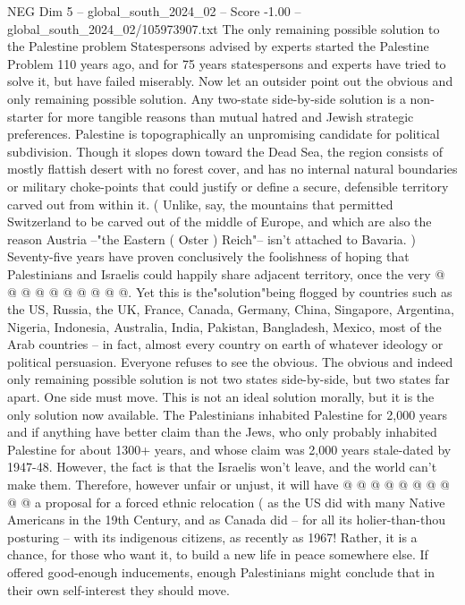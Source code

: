 \begin{textsample}{NEG Dim 5 – global\_south\_2024\_02 – Score -1.00 – global\_south\_2024\_02/105973907.txt}  \label{ex:f5_neg_300}
The only remaining possible solution to the Palestine problem Statespersons advised by experts started the Palestine Problem 110 years ago, and for 75 years statespersons and experts have tried to solve it, but have failed miserably.
Now let an outsider point out the obvious and only remaining possible solution.
Any two-state side-by-side solution is a non-starter for more tangible reasons than mutual hatred and Jewish strategic preferences.
Palestine is topographically an unpromising candidate for political subdivision.
Though it slopes down toward the Dead Sea, the region consists of mostly flattish desert with no forest cover, and has no internal natural boundaries or military choke-points that could justify or define a secure, defensible territory carved out from within it. ( Unlike, say, the mountains that permitted Switzerland to be carved out of the middle of Europe, and which are also the reason Austria --"the Eastern ( Oster ) Reich"-- isn't attached to Bavaria. ) Seventy-five years have proven conclusively the foolishness of hoping that Palestinians and Israelis could happily share adjacent territory, once the very @ @ @ @ @ @ @ @ @ @.
Yet this is the"solution"being flogged by countries such as the US, Russia, the UK, France, Canada, Germany, China, Singapore, Argentina, Nigeria, Indonesia, Australia, India, Pakistan, Bangladesh, Mexico, most of the Arab countries -- in fact, almost every country on earth of whatever ideology or political persuasion.
Everyone refuses to see the obvious.
The obvious and indeed only remaining possible solution is not two states side-by-side, but two states far apart.
One side must move.
This is not an ideal solution morally, but it is the only solution now available.
The Palestinians inhabited Palestine for 2,000 years and if anything have better claim than the Jews, who only probably inhabited Palestine for about 1300+ years, and whose claim was 2,000 years stale-dated by 1947-48.
However, the fact is that the Israelis won't leave, and the world can't make them.
Therefore, however unfair or unjust, it will have @ @ @ @ @ @ @ @ @ @ a proposal for a forced ethnic relocation ( as the US did with many Native Americans in the 19th Century, and as Canada did -- for all its holier-than-thou posturing -- with its indigenous citizens, as recently as 1967!
Rather, it is a chance, for those who want it, to build a new life in peace somewhere else.
If offered good-enough inducements, enough Palestinians might conclude that in their own self-interest they should move.

\end{textsample}
